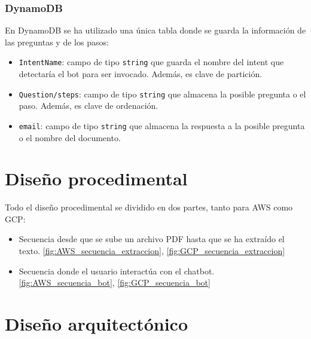 \subsubsection{DynamoDB}
En DynamoDB se ha utilizado una única tabla donde se guarda la información de las preguntas y de los pasos:
\begin{itemize}
        \item \texttt{IntentName}: campo de tipo \texttt{string} que guarda el nombre del intent que detectaría el bot para ser invocado. Además, es clave de partición.
        \item \texttt{Question/steps}: campo de tipo \texttt{string} que almacena la posible pregunta o el paso. Además, es clave de ordenación.
        \item \texttt{email}: campo de tipo \texttt{string} que almacena la respuesta a la posible pregunta o el nombre del documento.
\end{itemize}

\section{Diseño procedimental}

Todo el diseño procedimental se dividido en dos partes, tanto para AWS como GCP:
\begin{itemize}
    \item Secuencia desde que se sube un archivo PDF hasta que se ha extraído el texto. \ref{fig:AWS_secuencia_extraccion}, \ref{fig:GCP_secuencia_extraccion}
    \item Secuencia donde el usuario interactúa con el chatbot. \ref{fig:AWS_secuencia_bot}, \ref{fig:GCP_secuencia_bot}
\end{itemize}







\section{Diseño arquitectónico}

